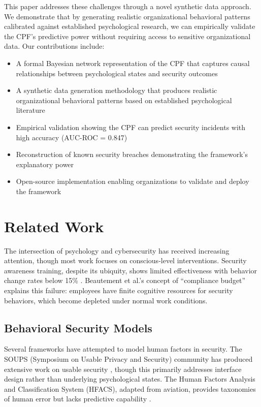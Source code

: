 \documentclass[10pt,twocolumn]{IEEEtran}
\begin{document}
This paper addresses these challenges through a novel synthetic data approach. We demonstrate that by generating realistic organizational behavioral patterns calibrated against established psychological research, we can empirically validate the CPF's predictive power without requiring access to sensitive organizational data. Our contributions include:

\begin{itemize}
\item A formal Bayesian network representation of the CPF that captures causal relationships between psychological states and security outcomes
\item A synthetic data generation methodology that produces realistic organizational behavioral patterns based on established psychological literature  
\item Empirical validation showing the CPF can predict security incidents with high accuracy (AUC-ROC = 0.847)
\item Reconstruction of known security breaches demonstrating the framework's explanatory power
\item Open-source implementation enabling organizations to validate and deploy the framework
\end{itemize}

\section{Related Work}

The intersection of psychology and cybersecurity has received increasing attention, though most work focuses on conscious-level interventions. Security awareness training, despite its ubiquity, shows limited effectiveness with behavior change rates below 15\% \cite{sans2023}. Beautement et al.'s concept of ``compliance budget'' \cite{beautement2008} explains this failure: employees have finite cognitive resources for security behaviors, which become depleted under normal work conditions.

\subsection{Behavioral Security Models}

Several frameworks have attempted to model human factors in security. The SOUPS (Symposium on Usable Privacy and Security) community has produced extensive work on usable security \cite{cranor2005}, though this primarily addresses interface design rather than underlying psychological states. The Human Factors Analysis and Classification System (HFACS), adapted from aviation, provides taxonomies of human error but lacks predictive capability \cite{shappell2000}.
\end{document}
